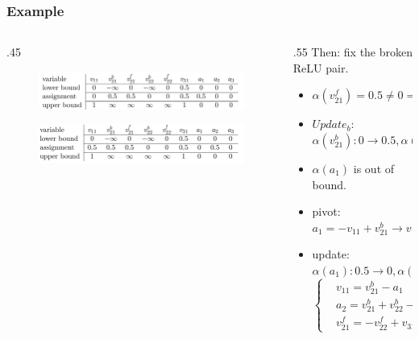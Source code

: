 \documentclass[aspectratio=169%
,serif,mathserif]{beamer}
\begin{document}
\begin{frame}
	\frametitle{Example}
	\begin{columns}
		\begin{column}{.45\textwidth}
			\begin{figure}[htbp]
				\includegraphics[width=1\linewidth]{9.png}
			\end{figure}
			\begin{figure}[htbp]
				\includegraphics[width=1\linewidth]{10.png}
			\end{figure}
		\end{column}

		\begin{column}{.55\textwidth}
				Then: fix  the broken ReLU pair.
			\begin{itemize}
				\item $\alpha\left(v_{21}^{f}\right)=0.5 \neq 0=\max \left(0, \alpha\left(v_{21}^{b}\right)\right)$
				\item $Update_b$: $\alpha(v_{21}^b):0 \to 0.5,\alpha(a_{1}):0 \to 0.5$
				\item $\alpha(a_{1})$ is out of bound.
				\item pivot: $a_{1}=-v_{11}+v_{21}^{b} \to v_{11}=v_{21}^{b}-a_{1},a_{2}=v_{11}+v_{22}^{b} \to a_{2}=v_{21}^{b}+v_{22}^{b}-a_{1}$
				\item update: $\alpha(a_{1}):0.5 \to 0,\alpha(v_{11}):0 \to 0.5,\alpha(a_{2}):0 \to 0.5$
				\begin{equation}
					\left\{
						\begin{array}{lll}
						& v_{11}=v_{21}^{b}-a_{1}\\
						& a_{2}=v_{21}^{b}+v_{22}^{b}-a_{1}\\
						& v_{21}^{f}=-v_{22}^{f}+v_{31}-a_{3}
					\end{array} \right.
				\end{equation}
			\end{itemize}
		\end{column}
	\end{columns}
\end{frame}
\end{document}
